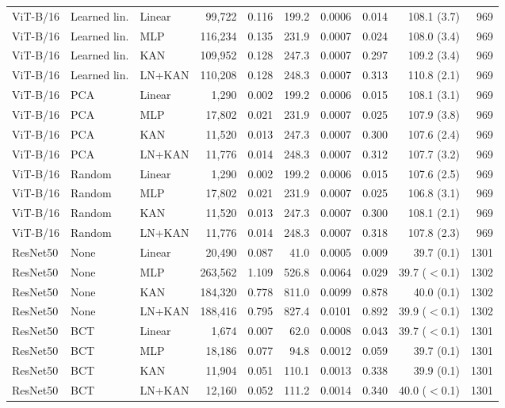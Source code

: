 \documentclass[10pt]{article}
\begin{document}
\begin{longtable}{lllrrrrrrr}
ViT-B/16 & Learned lin. & Linear & 99,722 & 0.116 & 199.2 & 0.0006 & 0.014 & 108.1 (3.7) & 969 \\
ViT-B/16 & Learned lin. & MLP & 116,234 & 0.135 & 231.9 & 0.0007 & 0.024 & 108.0 (3.4) & 969 \\
ViT-B/16 & Learned lin. & KAN & 109,952 & 0.128 & 247.3 & 0.0007 & 0.297 & 109.2 (3.4) & 969 \\
ViT-B/16 & Learned lin. & LN+KAN & 110,208 & 0.128 & 248.3 & 0.0007 & 0.313 & 110.8 (2.1) & 969 \\
ViT-B/16 & PCA & Linear & 1,290 & 0.002 & 199.2 & 0.0006 & 0.015 & 108.1 (3.1) & 969 \\
ViT-B/16 & PCA & MLP & 17,802 & 0.021 & 231.9 & 0.0007 & 0.025 & 107.9 (3.8) & 969 \\
ViT-B/16 & PCA & KAN & 11,520 & 0.013 & 247.3 & 0.0007 & 0.300 & 107.6 (2.4) & 969 \\
ViT-B/16 & PCA & LN+KAN & 11,776 & 0.014 & 248.3 & 0.0007 & 0.312 & 107.7 (3.2) & 969 \\
ViT-B/16 & Random & Linear & 1,290 & 0.002 & 199.2 & 0.0006 & 0.015 & 107.6 (2.5) & 969 \\
ViT-B/16 & Random & MLP & 17,802 & 0.021 & 231.9 & 0.0007 & 0.025 & 106.8 (3.1) & 969 \\
ViT-B/16 & Random & KAN & 11,520 & 0.013 & 247.3 & 0.0007 & 0.300 & 108.1 (2.1) & 969 \\
ViT-B/16 & Random & LN+KAN & 11,776 & 0.014 & 248.3 & 0.0007 & 0.318 & 107.8 (2.3) & 969 \\
\midrule
ResNet50 & None & Linear & 20,490 & 0.087 & 41.0 & 0.0005 & 0.009 & 39.7 (0.1) & 1301 \\
ResNet50 & None & MLP & 263,562 & 1.109 & 526.8 & 0.0064 & 0.029 & 39.7 ($<$0.1) & 1302 \\
ResNet50 & None & KAN & 184,320 & 0.778 & 811.0 & 0.0099 & 0.878 & 40.0 (0.1) & 1302 \\
ResNet50 & None & LN+KAN & 188,416 & 0.795 & 827.4 & 0.0101 & 0.892 & 39.9 ($<$0.1) & 1302 \\
ResNet50 & BCT & Linear & 1,674 & 0.007 & 62.0 & 0.0008 & 0.043 & 39.7 ($<$0.1) & 1301 \\
ResNet50 & BCT & MLP & 18,186 & 0.077 & 94.8 & 0.0012 & 0.059 & 39.7 (0.1) & 1301 \\
ResNet50 & BCT & KAN & 11,904 & 0.051 & 110.1 & 0.0013 & 0.338 & 39.9 (0.1) & 1301 \\
ResNet50 & BCT & LN+KAN & 12,160 & 0.052 & 111.2 & 0.0014 & 0.340 & 40.0 ($<$0.1) & 1301 \\

\end{longtable}
\end{document}
